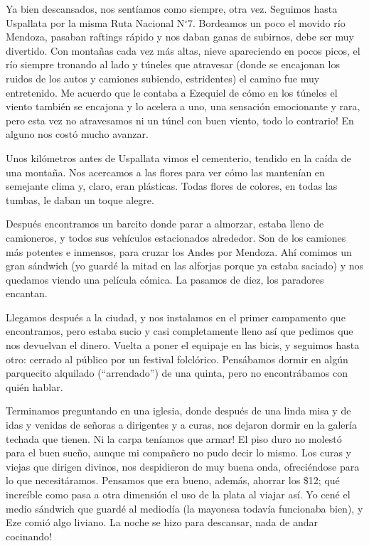 Ya bien descansados, nos sent\'iamos como siempre, otra vez. Seguimos hasta
Uspallata por la misma Ruta Nacional N$^\circ$7. Bordeamos un poco el movido
r\'io Mendoza, pasaban raftings r\'apido y nos daban ganas de subirnos, debe ser
muy divertido. Con monta\~nas cada vez m\'as altas, nieve apareciendo en pocos
picos, el r\'io siempre tronando al lado y t\'uneles que atravesar (donde se
encajonan los ruidos de los autos y camiones subiendo, estridentes) el
camino fue muy entretenido. Me acuerdo que le contaba a Ezequiel de c\'omo en
los t\'uneles el viento tambi\'en se encajona y lo acelera a uno, una
sensaci\'on emocionante y rara, pero esta vez no atravesamos ni un t\'unel con
buen viento, \textexclamdown todo lo contrario! En alguno nos cost\'o mucho
avanzar.

Unos kil\'ometros antes de Uspallata vimos el cementerio, tendido en la ca\'ida
de una monta\~na. Nos acercamos a las flores para ver c\'omo las manten\'ian en
semejante clima y, claro, eran pl\'asticas. Todas flores de colores, en todas
las tumbas, le daban un toque alegre.

Despu\'es encontramos un barcito donde parar a almorzar, estaba lleno de
camioneros, y todos sus veh\'iculos estacionados alrededor. Son de los camiones
m\'as potentes e inmensos, para cruzar los Andes por Mendoza. Ah\'i comimos un
gran s\'andwich (yo guard\'e la mitad en las alforjas porque ya estaba saciado)
y nos quedamos viendo una pel\'icula c\'omica. La pasamos de diez, los paradores
encantan.

Llegamos despu\'es a la ciudad, y nos instalamos en el primer campamento que
encontramos, pero estaba sucio y casi completamente lleno as\'i que pedimos que
nos devuelvan el dinero. Vuelta a poner el equipaje en las bicis, y seguimos
hasta otro: cerrado al p\'ublico por un festival folcl\'orico. Pens\'abamos
dormir en alg\'un parquecito alquilado (``arrendado'') de una quinta, pero no
encontr\'abamos con qui\'en hablar.

Terminamos preguntando en una iglesia, donde despu\'es de una linda misa y de
idas y venidas de se\~noras a dirigentes y a curas, nos dejaron dormir en la
galer\'ia techada que tienen. \textexclamdown Ni la carpa ten\'iamos que armar!
El piso duro no molest\'o para el buen sue\~no, aunque mi compa\~nero no pudo
decir lo mismo. Los curas y viejas que dirigen divinos, nos despidieron de muy
buena onda, ofreci\'endose para lo que necesit\'aramos. Pensamos que era bueno,
adem\'as, ahorrar los \$12; qu\'e incre\'ible como pasa a otra dimensi\'on el
uso de la plata al viajar as\'i. Yo cen\'e el medio s\'andwich que guard\'e al
mediod\'ia (la mayonesa todav\'ia funcionaba bien), y Eze comi\'o algo liviano.
La noche se hizo para descansar, \textexclamdown nada de andar cocinando!

